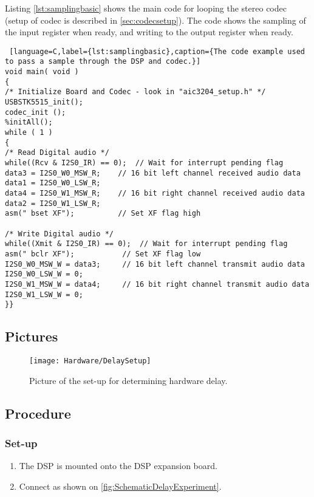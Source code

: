 Listing \ref{lst:samplingbasic} shows the main code for looping the stereo codec (setup of codec is described in \autoref{sec:codecsetup}). The code shows the sampling of the input register when ready, and writing to the output register when ready. 

\begin{lstlisting} [language=C,label={lst:samplingbasic},caption={The code example used to pass a sample through the DSP and codec.}]
void main( void )
{
/* Initialize Board and Codec - look in "aic3204_setup.h" */
USBSTK5515_init();
codec_init ();
%initAll();
while ( 1 )
{
/* Read Digital audio */
while((Rcv & I2S0_IR) == 0);  // Wait for interrupt pending flag
data3 = I2S0_W0_MSW_R;    // 16 bit left channel received audio data
data1 = I2S0_W0_LSW_R;
data4 = I2S0_W1_MSW_R;    // 16 bit right channel received audio data
data2 = I2S0_W1_LSW_R;
asm(" bset XF");	  	  // Set XF flag high

/* Write Digital audio */
while((Xmit & I2S0_IR) == 0);  // Wait for interrupt pending flag
asm(" bclr XF");		   // Set XF flag low
I2S0_W0_MSW_W = data3;     // 16 bit left channel transmit audio data
I2S0_W0_LSW_W = 0;
I2S0_W1_MSW_W = data4;     // 16 bit right channel transmit audio data
I2S0_W1_LSW_W = 0;
}}
\end{lstlisting}


\subsection{Pictures}

\begin{figure}[H]
	\centering
\texttt{[image: Hardware/DelaySetup]}
	\caption{Picture of the set-up for {}determining hardware delay.}
	\label{fig:DelayExperimentSetup}
\end{figure}

\subsection{Procedure}
\subsubsection{Set-up}
\begin{enumerate}
	\item The DSP is mounted onto the DSP expansion board.
	\item Connect as shown on \autoref{fig:SchematicDelayExperiment}.
\end{enumerate}


